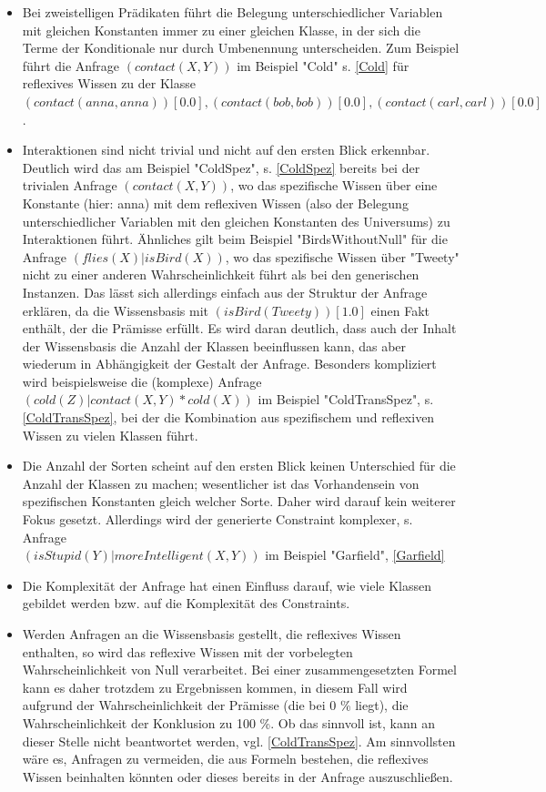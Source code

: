 \documentclass[a4paper, 11pt]{book}
\begin{document}
\begin{itemize}
	\item Bei zweistelligen Prädikaten führt die Belegung unterschiedlicher Variablen mit gleichen Konstanten immer zu einer gleichen Klasse, in der sich die Terme der Konditionale nur durch Umbenennung unterscheiden. Zum Beispiel führt die Anfrage $ (contact(X,Y)) $ im Beispiel "{}Cold"{} s. \ref{Cold} für reflexives Wissen zu der Klasse $ (contact(anna,anna))[0.0], (contact(bob,bob))[0.0] , (contact(carl,carl))[0.0]  $.
	\item Interaktionen sind nicht trivial und nicht auf den ersten Blick erkennbar. Deutlich wird das am Beispiel "{}ColdSpez"{}, s. \ref{ColdSpez} bereits bei der trivialen Anfrage $ (contact(X,Y)) $, wo das spezifische Wissen über eine Konstante (hier: anna) mit dem reflexiven Wissen (also der Belegung unterschiedlicher Variablen mit den gleichen Konstanten des Universums) zu Interaktionen führt. Ähnliches gilt beim Beispiel "{}BirdsWithoutNull"{} für die Anfrage $ (flies(X) | isBird(X)) $, wo das spezifische Wissen über "{}Tweety"{} nicht zu einer anderen Wahrscheinlichkeit führt als bei den generischen Instanzen. Das lässt sich allerdings einfach aus der Struktur der Anfrage erklären, da die Wissensbasis mit $ (isBird(Tweety))[1.0] $ einen Fakt enthält, der die Prämisse erfüllt. Es wird daran deutlich, dass auch der Inhalt der Wissensbasis die Anzahl der Klassen beeinflussen kann, das aber wiederum in Abhängigkeit der Gestalt der Anfrage. Besonders kompliziert wird beispielsweise die (komplexe) Anfrage $ (cold(Z)|contact(X,Y) * cold(X)) $ im Beispiel "{}ColdTransSpez"{}, s. \ref{ColdTransSpez}, bei der die Kombination aus spezifischem und reflexiven Wissen zu vielen Klassen führt.
	\item Die Anzahl der Sorten scheint auf den ersten Blick keinen Unterschied für die Anzahl der Klassen zu machen; wesentlicher ist das Vorhandensein von spezifischen Konstanten gleich welcher Sorte. Daher wird darauf kein weiterer Fokus gesetzt. Allerdings wird der generierte Constraint komplexer, s. Anfrage \\ $ (isStupid(Y)|moreIntelligent(X,Y)) $ im Beispiel "{}Garfield"{}, \ref{Garfield}
	\item Die Komplexität der Anfrage hat einen Einfluss darauf, wie viele Klassen gebildet werden bzw. auf die Komplexität des Constraints. 	
	\item Werden Anfragen an die Wissensbasis gestellt, die reflexives Wissen enthalten, so wird das reflexive Wissen mit der vorbelegten Wahrscheinlichkeit von Null verarbeitet. Bei einer zusammengesetzten Formel kann es daher trotzdem zu Ergebnissen kommen, in diesem Fall wird aufgrund der Wahrscheinlichkeit der Prämisse (die bei 0 \% liegt), die Wahrscheinlichkeit der Konklusion zu 100 \%. Ob das sinnvoll ist, kann an dieser Stelle nicht beantwortet werden, vgl. \ref{ColdTransSpez}. Am sinnvollsten wäre es, Anfragen zu vermeiden, die aus Formeln bestehen, die reflexives Wissen beinhalten könnten oder dieses bereits in der Anfrage auszuschließen. 
	
\end{itemize}
\end{document}
